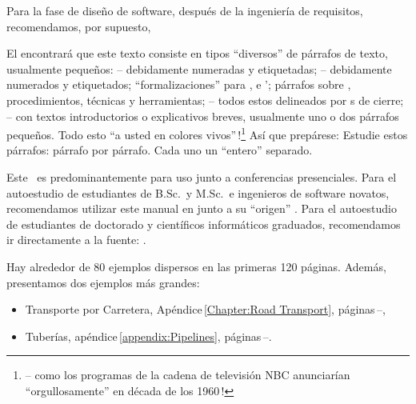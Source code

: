 \begynd
\pind Para la fase de diseño de software, después de la ingeniería de requisitos,
\pind recomendamos, por supuesto, \cite[
      ols.\,1--2]{TheSEBook1,TheSEBook2} 
\afslut

\label{The Structuring of The Text}

\begynd
\pind El  encontrará que este texto consiste en
      tipos ``diversos'' de párrafos de texto, usualmente pequeños:
\begynd
\pind {} -- debidamente numeradas y etiquetadas;
\pind {} -- debidamente numerados y etiquetados;
\pind ``formalizaciones'' para ,  e 
       ';
\pind párrafos sobre , procedimientos, técnicas y herramientas;
\pind -- todos estos delineados por {\dbsquare}s de cierre;
\pind -- con textos introductorios o explicativos breves, usualmente uno o dos párrafos pequeños.
\afslut
\pind Todo esto  \textsf{``a usted en colores
  vivos''\,!}\footnote{\LLLL -- como los programas de la cadena de televisión \textsf{NBC}
  anunciarían ``orgullosamente'' en década de los 1960\,!}
\pind Así que prepárese:
\begynd
\pind Estudie estos párrafos: párrafo por párrafo.
\pind Cada uno  un ``entero'' separado.
\afslut
\afslut


\label{sec:Used for Self-Study}

\begynd
\pind Este \manual\ es predominantemente para uso junto a conferencias presenciales.
\pind Para el autoestudio de estudiantes de B.Sc.\ y M.Sc.\ e
      ingenieros de software novatos, recomendamos utilizar este manual en
      junto a su ``origen'' \cite{BjornerMonograph2020}.
\pind Para el autoestudio de estudiantes de doctorado y científicos
      informáticos graduados, recomendamos ir directamente a la fuente:
      \cite{BjornerMonograph2020}.   
\afslut

\label{primer:Two Examples}

\begynd
\pind Hay alrededor de 80 ejemplos dispersos en las primeras 120 páginas.
\pind Además, presentamos dos ejemplos más grandes:
\afslut
\begin{itemize}
\item \textsf{Transporte por Carretera}, Apéndice\,\ref{Chapter:Road
        Transport}, páginas\,\pageref{Chapter:Road Transport}--\pageref{p-ch:Road Transport.n}, 
\item \textsf{Tuberías},
      apéndice\,\ref{appendix:Pipelines}, páginas\,\pageref{appendix:Pipelines}--\pageref{appendix:Pipelines.n}. 
\end{itemize}

